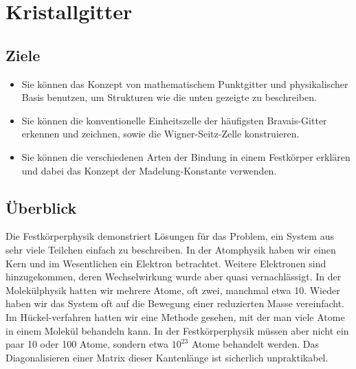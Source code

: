 \renewcommand{\chapterauthors}{Markus Lippitz}
\renewcommand{\lastmod}{17. Dezember 2021}


\chapter{Kristallgitter}


\section{Ziele}

\begin{itemize}

\item Sie können das Konzept von mathematischem Punktgitter und physikalischer Basis benutzen, um Strukturen wie die unten gezeigte zu beschreiben.

\item Sie können die konventionelle Einheitszelle der häufigsten Bravais-Gitter erkennen und zeichnen, sowie die Wigner-Seitz-Zelle konstruieren.

\item Sie können die verschiedenen Arten der Bindung in einem Festkörper erklären und dabei das Konzept der Madelung-Konstante verwenden.

\end{itemize}


\begin{figure}
\end{figure}



\section{Überblick}

Die Festkörperphysik demonstriert Lösungen für das Problem, ein System aus sehr viele Teilchen einfach zu beschreiben. In der Atomphysik haben wir einen Kern und im Wesentlichen ein Elektron betrachtet. Weitere Elektronen sind hinzugekommen, deren Wechselwirkung wurde aber quasi vernachlässigt. In der Molekülphysik hatten wir mehrere Atome, oft zwei, manchmal etwa 10. Wieder haben wir das System oft auf die Bewegung einer reduzierten Masse vereinfacht. Im Hückel-verfahren hatten wir eine Methode gesehen, mit der man viele Atome in einem Molekül behandeln kann. In der Festkörperphysik müssen aber nicht ein paar 10 oder 100 Atome, sondern etwa $10^{23}$ Atome behandelt werden. Das Diagonalisieren einer Matrix dieser Kantenlänge ist sicherlich unpraktikabel.

